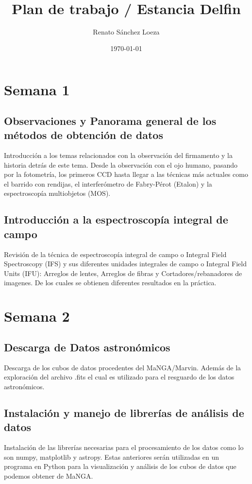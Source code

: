 \documentclass[12pt]{article}
\title{\sffamily \textbf{Plan de trabajo / Estancia Delfin}}
\date{\today}
\author{\sffamily Renato Sánchez Loeza}
\begin{document}
\maketitle

\section*{Semana 1}
\subsection*{Observaciones y Panorama general de los métodos de obtención de datos}
Introducción a los temas relacionados con la observación del firmamento y la historia detrás de este tema. Desde la observación con el ojo humano, pasando por la fotometría, los primeros CCD hasta llegar a las técnicas más actuales como el barrido con rendijas, el interferómetro de Fabry-Pérot (Etalon) y la espectroscopía multiobjetos (MOS).

\subsection*{Introducción a la espectroscopía integral de campo}
Revisión de la técnica de espectroscopía integral de campo o Integral Field Spectroscopy (IFS) y sus diferentes unidades integrales de campo o Integral Field Units (IFU): Arreglos de lentes, Arreglos de fibras y Cortadores/rebanadores de imagenes. De los cuales se obtienen diferentes resultados en la práctica.

\section*{Semana 2}
\subsection*{Descarga de Datos astronómicos}
Descarga de los cubos de datos procedentes del MaNGA/Marvin. Además de la exploración del archivo .fits el cual es utilizado para el resguardo de los datos astronómicos.

\subsection*{Instalación y manejo de librerías de análisis de datos}
Instalación de las librerías necesarias para el procesamiento de los datos como lo son numpy, matplotlib y astropy. Estas anteriores serán utilizadas en un programa en Python para la visualización y análisis de los cubos de datos que podemos obtener de MaNGA.
\end{document}
